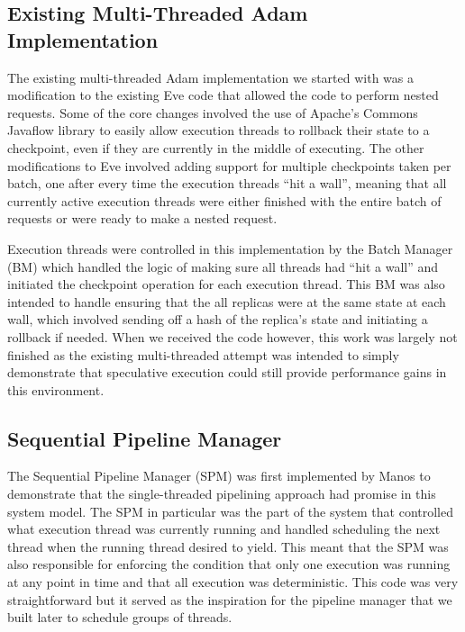 \documentclass[11pt, oneside]{report}
\begin{document}
\subsection{Existing Multi-Threaded Adam Implementation}\label{BM}

The existing multi-threaded Adam implementation we started with was a modification to the existing Eve \cite{eve} code that allowed the code to perform nested requests. 
Some of the core changes involved the use of Apache's Commons Javaflow library \cite{javaflow} to easily allow execution threads to rollback their state to a checkpoint, even if they are currently in the middle of executing. 
The other modifications to Eve involved adding support for multiple checkpoints taken per batch, one after every time the execution threads ``hit a wall'', meaning that all currently active execution threads were either finished with the entire batch of requests or were ready to make a nested request.

Execution threads were controlled in this implementation by the Batch Manager (BM) which handled the logic of making sure all threads had ``hit a wall'' and initiated the checkpoint operation for each execution thread. 
This BM was also intended to handle ensuring that the all replicas were at the same state at each wall, which involved sending off a hash of the replica's state and initiating a rollback if needed. 
When we received the code however, this work was largely not finished as the existing multi-threaded attempt was intended to simply demonstrate that speculative execution could still provide performance gains in this environment.

\subsection{Sequential Pipeline Manager}\label{SPM}

The Sequential Pipeline Manager (SPM) was first implemented by Manos to demonstrate that the single-threaded pipelining approach had promise in this system model. 
The SPM in particular was the part of the system that controlled what execution thread was currently running and handled scheduling the next thread when the running thread desired to yield.
This meant that the SPM was also responsible for enforcing the condition that only one execution was running at any point in time and that all execution was deterministic.
This code was very straightforward but it served as the inspiration for the pipeline manager that we built later to schedule groups of threads.
\end{document}
